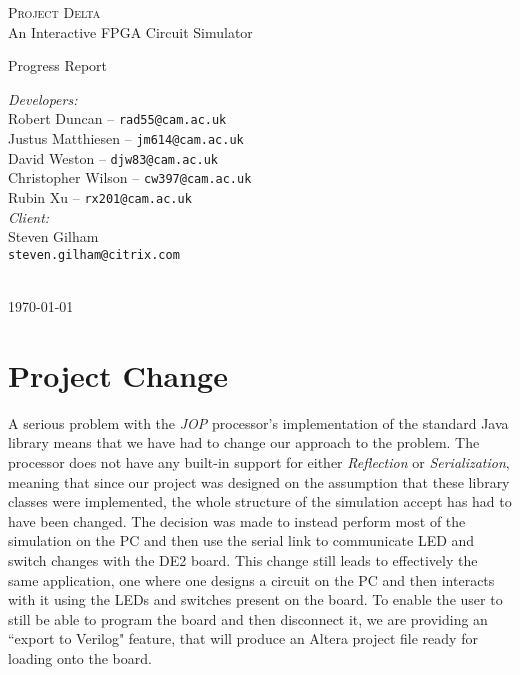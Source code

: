 \documentclass[12pt, a4paper, oneside,titlepage]{article}
\begin{document}
 \begin{titlepage}
 \begin{center}
 \textsc{\huge{Project Delta}} \\
 {\Large{An Interactive FPGA Circuit Simulator}}
\end{center}
\vspace{10em}
 \begin{center}
{\huge{Progress Report}}
\end{center}
\vfill
\setlength{\columnsep}{10em}
\begin{multicols}{2}{
\emph{Developers:}\\
Robert Duncan -- \texttt{rad55@cam.ac.uk} \\
Justus Matthiesen -- \texttt{jm614@cam.ac.uk}\\
David Weston -- \texttt{djw83@cam.ac.uk}\\
Christopher Wilson -- \texttt{cw397@cam.ac.uk}\\
Rubin Xu -- \texttt{rx201@cam.ac.uk}\\
\emph{Client:}\\
Steven Gilham\\
\texttt{steven.gilham@citrix.com}
\\
\\
}
\end{multicols}
\begin{center}
\today
\end{center}
 \end{titlepage}

\tableofcontents
\newpage
\setlength{\parskip}{\medskipamount}
\section{Project Change}
A serious problem with the \emph{JOP} processor's implementation of the standard Java library means that we have had to change our approach to the problem.
The processor does not have any built-in support for either \emph{Reflection} or \emph{Serialization}, meaning that since our project was designed on the assumption that 
these library classes were implemented, the whole structure of the simulation accept has had to have been changed. The decision was made to instead perform
most of the simulation on the PC and then use the serial link to communicate LED and switch changes with the DE2 board. This change still leads to effectively
the same application, one where one designs a circuit on the PC and then interacts with it using the LEDs and switches present on the board. To enable the user to still be able to program the board and then disconnect it, we are providing an ``export to Verilog" feature, that will produce an Altera project file ready for loading onto the board. 
\end{document}
